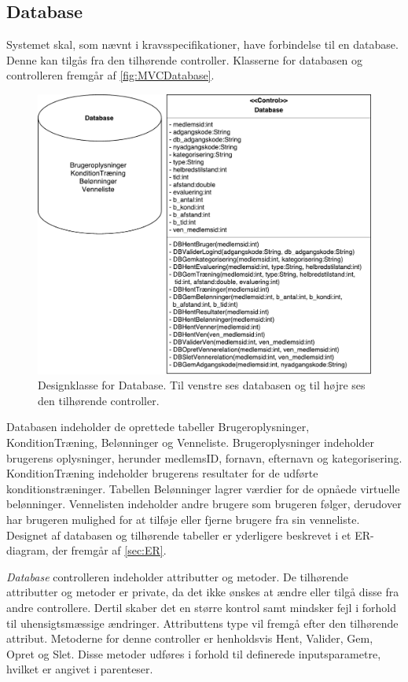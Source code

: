 \subsection*{Database} \label{sec:databaseDesign}
Systemet skal, som nævnt i kravsspecifikationer, have forbindelse til en database. Denne kan tilgås fra den tilhørende controller. Klasserne for databasen og controlleren fremgår af \autoref{fig:MVCDatabase}. 

\begin{figure} [H]
\centering
\includegraphics[width=1\textwidth]{figures/MVC/MVCDatabase}
\caption{Designklasse for Database. Til venstre ses databasen og til højre ses den tilhørende controller.}
\label{fig:MVCDatabase}
\end{figure}

\noindent
Databasen indeholder de oprettede tabeller Brugeroplysninger, KonditionTræning, Belønninger og Venneliste. Brugeroplysninger indeholder brugerens oplysninger, herunder medlemsID, fornavn, efternavn og kategorisering. KonditionTræning indeholder brugerens resultater for de udførte konditionstræninger. Tabellen Belønninger lagrer værdier for de opnåede virtuelle belønninger. Vennelisten indeholder andre brugere som brugeren følger, derudover har brugeren mulighed for at tilføje eller fjerne brugere fra sin venneliste. Designet af databasen og tilhørende tabeller er yderligere beskrevet i et ER-diagram, der fremgår af \autoref{sec:ER}. 

\textit{Database} controlleren indeholder attributter og metoder. De tilhørende attributter og metoder er private, da det ikke ønskes at ændre eller tilgå disse fra andre controllere. Dertil skaber det en større kontrol samt mindsker fejl i forhold til uhensigtsmæssige ændringer. Attributtens type vil fremgå efter den tilhørende attribut. Metoderne for denne controller er henholdsvis Hent, Valider, Gem, Opret og Slet. Disse metoder udføres i forhold til definerede inputsparametre, hvilket er angivet i parenteser.

